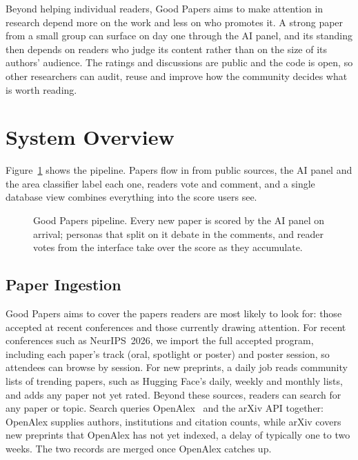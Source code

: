 \documentclass[sigconf]{acmart}
\newcommand{\sys}{Good Papers}
\begin{document}
Beyond helping individual readers, \sys{} aims to make attention in research depend more on the work and less on who promotes it.
A strong paper from a small group can surface on day one through the AI panel, and its standing then depends on readers who judge its content rather than on the size of its authors' audience.
The ratings and discussions are public and the code is open, so other researchers can audit, reuse and improve how the community decides what is worth reading.


\section{System Overview}
Figure~\ref{fig:arch} shows the pipeline.
Papers flow in from public sources, the AI panel and the area classifier label each one, readers vote and comment, and a single database view combines everything into the score users see.

\begin{figure}[t]
  \centering
  
  \caption{\sys{} pipeline. Every new paper is scored by the AI panel on arrival; personas that split on it debate in the comments, and reader votes from the interface take over the score as they accumulate.}
  \label{fig:arch}
\end{figure}

\subsection{Paper Ingestion}
\sys{} aims to cover the papers readers are most likely to look for: those accepted at recent conferences and those currently drawing attention.
For recent conferences such as NeurIPS~2026, we import the full accepted program, including each paper's track (oral, spotlight or poster) and poster session, so attendees can browse by session.
For new preprints, a daily job reads community lists of trending papers, such as Hugging Face's daily, weekly and monthly lists, and adds any paper not yet rated.
Beyond these sources, readers can search for any paper or topic.
Search queries OpenAlex~\cite{priem2022openalex} and the arXiv API together: OpenAlex supplies authors, institutions and citation counts, while arXiv covers new preprints that OpenAlex has not yet indexed, a delay of typically one to two weeks.
The two records are merged once OpenAlex catches up.
\end{document}
